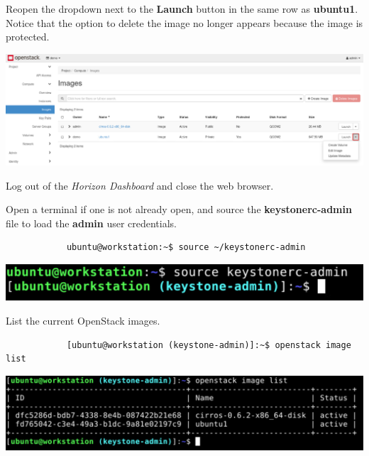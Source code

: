 \documentclass[letterpaper, 12pt]{article}
\begin{document}
\begin{enumerate}
    \begin{labstep}
        Reopen the dropdown next to the \textbf{Launch} button in the same row as \textbf{ubuntu1}.
        Notice that the option to delete the image no longer appears because the image is protected.

        \begin{center}
            \includegraphics[width=\linewidth]{images/part1/step11.png}
        \end{center}
    \end{labstep}

    \begin{labstep}
        Log out of the \textit{Horizon Dashboard} and close the web browser.
    \end{labstep}

    \begin{labstep}
        Open a terminal if one is not already open, and source the \textbf{keystonerc-admin} file to load the \textbf{admin} user credentials.
        \begin{lstlisting}
            ubuntu@workstation:~$ source ~/keystonerc-admin
        \end{lstlisting}

        \begin{center}
            \includegraphics[width=\linewidth]{images/part1/step13.png}
        \end{center}
    \end{labstep}

    \begin{labstep}
        List the current OpenStack images.
        \begin{lstlisting}
            [ubuntu@workstation (keystone-admin)]:~$ openstack image list
        \end{lstlisting}

        \begin{center}
            \includegraphics[width=\linewidth]{images/part1/step14.png}
        \end{center}
    \end{labstep}


\end{enumerate}
\end{document}
